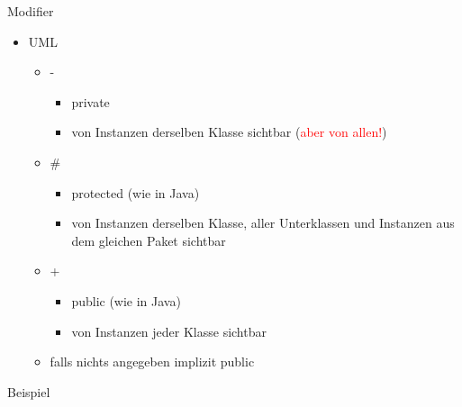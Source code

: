 \documentclass[18pt]{beamer}
\begin{document}
\begin{frame}{Modifier}
	\begin{itemize}
		\item UML
		\begin{itemize}
			\item -
			\begin{itemize}
				\item private
				\item von Instanzen derselben Klasse sichtbar (\textcolor{red}{aber von allen!})
			\end{itemize}
			\item \#
			\begin{itemize}
				\item protected (wie in Java)
				\item von Instanzen derselben Klasse, aller Unterklassen und Instanzen aus dem gleichen Paket sichtbar
			\end{itemize}
			\item +
			\begin{itemize}
				\item public (wie in Java)
				\item von Instanzen jeder Klasse sichtbar
			\end{itemize}
			\item falls nichts angegeben implizit public
		\end{itemize}
	\end{itemize}
\end{frame}

\begin{frame}{Beispiel}
\begin{figure}
	\centering
\end{figure}
\end{frame}
	
\end{document}
